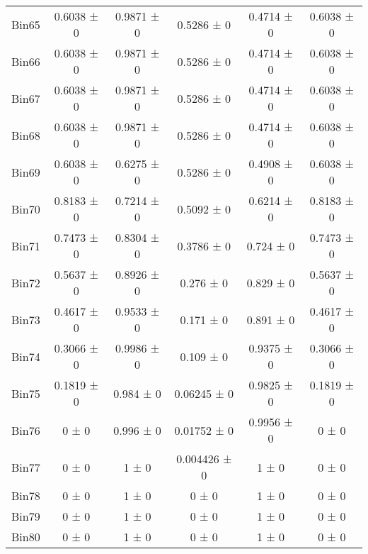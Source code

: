 \begin{tabular}{@{\extracolsep{4pt}}lccccc@{}}
     Bin65 & 0.6038 ± 0 & 0.9871 ± 0 & 0.5286 ± 0 & 0.4714 ± 0 & 0.6038 ± 0 \\ 
     Bin66 & 0.6038 ± 0 & 0.9871 ± 0 & 0.5286 ± 0 & 0.4714 ± 0 & 0.6038 ± 0 \\ 
     Bin67 & 0.6038 ± 0 & 0.9871 ± 0 & 0.5286 ± 0 & 0.4714 ± 0 & 0.6038 ± 0 \\ 
     Bin68 & 0.6038 ± 0 & 0.9871 ± 0 & 0.5286 ± 0 & 0.4714 ± 0 & 0.6038 ± 0 \\ 
     Bin69 & 0.6038 ± 0 & 0.6275 ± 0 & 0.5286 ± 0 & 0.4908 ± 0 & 0.6038 ± 0 \\ 
     Bin70 & 0.8183 ± 0 & 0.7214 ± 0 & 0.5092 ± 0 & 0.6214 ± 0 & 0.8183 ± 0 \\ 
     Bin71 & 0.7473 ± 0 & 0.8304 ± 0 & 0.3786 ± 0 & 0.724 ± 0 & 0.7473 ± 0 \\ 
     Bin72 & 0.5637 ± 0 & 0.8926 ± 0 & 0.276 ± 0 & 0.829 ± 0 & 0.5637 ± 0 \\ 
     Bin73 & 0.4617 ± 0 & 0.9533 ± 0 & 0.171 ± 0 & 0.891 ± 0 & 0.4617 ± 0 \\ 
     Bin74 & 0.3066 ± 0 & 0.9986 ± 0 & 0.109 ± 0 & 0.9375 ± 0 & 0.3066 ± 0 \\ 
     Bin75 & 0.1819 ± 0 & 0.984 ± 0 & 0.06245 ± 0 & 0.9825 ± 0 & 0.1819 ± 0 \\ 
     Bin76 & 0 ± 0 & 0.996 ± 0 & 0.01752 ± 0 & 0.9956 ± 0 & 0 ± 0 \\ 
     Bin77 & 0 ± 0 & 1 ± 0 & 0.004426 ± 0 & 1 ± 0 & 0 ± 0 \\ 
     Bin78 & 0 ± 0 & 1 ± 0 & 0 ± 0 & 1 ± 0 & 0 ± 0 \\ 
     Bin79 & 0 ± 0 & 1 ± 0 & 0 ± 0 & 1 ± 0 & 0 ± 0 \\ 
     Bin80 & 0 ± 0 & 1 ± 0 & 0 ± 0 & 1 ± 0 & 0 ± 0 \\ 
\hline\hline
  \end{tabular}
